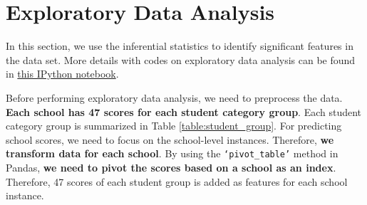 \documentclass[11pt]{article}
\begin{document}
\section{Exploratory Data Analysis}
\label{Exploratory Data Analysis}

In this section, we use the inferential statistics to identify significant features in the data set.
%
More details with codes on exploratory data analysis can be found in
\href{https://github.com/ahrimhan/data-science-project/blob/master/project1/exploratory_data_analysis.ipynb}{this IPython notebook}. 


Before performing exploratory data analysis, we need to preprocess the data.
%
\textbf{Each school has 47 scores for each student category group}. Each student category group is summarized in Table \ref{table:student_group}. 
%
For predicting school scores, we need to focus on the school-level instances.
%
Therefore, \textbf{we transform data for each school}.
By using the \texttt{`pivot\_table'} method in Pandas,
\textbf{we need to pivot the scores based on a school as an index}.
%
Therefore, 47 scores of each student group is added as features for each school instance.
\end{document}
